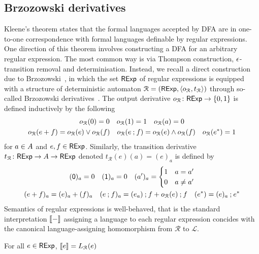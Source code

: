 \subsection{Brzozowski derivatives}\label{c2:subsec:brzozowski_derivatives}
Kleene's theorem states that the formal languages accepted by DFA are in one-to-one correspondence with formal languages definable by regular expressions. One direction of this theorem involves constructing a \textsf{DFA} for an arbitrary regular expression. The most common way is via Thompson construction, $\epsilon$-transition removal and determinisation. Instead, we recall a direct construction due to Brzozowski~\cite{Brzozowski:1964:Expressions}, in which the set $\mathsf{RExp}$ of regular expressions is equipped with a structure of deterministic automaton $\mathcal{R} = (\mathsf{RExp}, \langle o_{\mathcal{R}}, t_{\mathcal{R}} \rangle)$ through so-called Brzozowski derivatives~\cite{Brzozowski:1964:Expressions}. The output derivative $o_{\mathcal{R}} \colon \mathsf{RExp} \to \{0, 1\}$ is defined inductively by the following 
\begin{gather*}
    o_{\mathcal{R}}(0) = 0 \quad o_{\mathcal{R}}(1) = 1 \quad o_{\mathcal{R}}(a) = 0 \\ o_{\mathcal{R}}(e + f) = o_{\mathcal{R}}(e) \vee o_{\mathcal{R}}(f) \quad
    o_{\mathcal{R}}(e \mathbin{;} f) = o_{\mathcal{R}}(e) \wedge o_{\mathcal{R}}(f) \quad o_{\mathcal{R}}(e^{\ast}) = 1
\end{gather*}
for $a \in {A}$ and $e,f \in \mathsf{RExp}$. Similarly, the transition derivative $t_{\mathcal{R}} \colon \mathsf{RExp} \to {A} \to \mathsf{RExp}$ denoted $t_{\mathcal{R}} (e)(a) = (e)_a$ is defined by
\begin{gather*}
    (\mathsf{0})_a = 0 \quad (\mathsf{1})_a = 0 \quad (a')_a = \begin{cases}
        1 & a = a'\\ 0 & a \neq a'  \end{cases}\\
    (e + f)_a = (e)_a + (f)_a \quad
    (e \mathbin{;} f)_a = (e_a) \mathbin{;} f + o_{\mathcal{R}}(e) \mathbin{;} f \quad (e^{\ast}) = (e)_a \mathbin{;} e^{\ast}
\end{gather*}
Semantics of regular expressions is well-behaved, that is the standard interpretation $\left\llbracket{-}\right\rrbracket$ assigning a language to each regular expression concides with the canonical language-assigning homomorphism from $\mathcal{R}$ to $\mathcal{L}$.
\begin{lemma}\label{c2:lem:adequacy}
    For all $e \in \mathsf{RExp}$, $\left\llbracket{e}\right\rrbracket = L_{\mathcal{R}}(e)$
\end{lemma}

